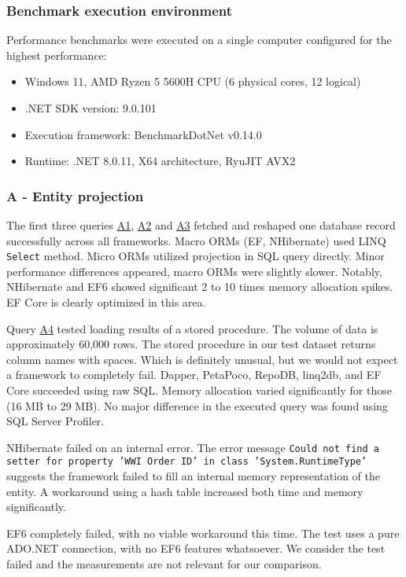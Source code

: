 \subsubsection{Benchmark execution environment}
Performance benchmarks were executed on a single computer configured for the highest performance:
\begin{itemize}
    \item Windows 11, AMD Ryzen 5 5600H CPU (6 physical cores, 12 logical)
    \item .NET SDK version: 9.0.101
    \item Execution framework: BenchmarkDotNet v0.14.0
    \item Runtime: .NET 8.0.11, X64 architecture, RyuJIT AVX2
\end{itemize}

\subsubsection{A - Entity projection}
The first three queries \hyperref[query:a1]{A1}, \hyperref[query:a2]{A2} and \hyperref[query:a3]{A3} fetched and reshaped one database record successfully across all frameworks. Macro ORMs (EF, NHibernate) used LINQ \texttt{Select} method. Micro ORMs utilized projection in SQL query directly.
Minor performance differences appeared, macro ORMs were slightly slower. Notably, NHibernate and EF6 showed significant 2 to 10 times memory allocation spikes. EF Core is clearly optimized in this area.

Query \hyperref[query:a4]{A4} tested loading results of a stored procedure. The volume of data is approximately 60,000 rows. The stored procedure in our test dataset returns column names with spaces. Which is definitely unusual, but we would not expect a framework to completely fail. Dapper, PetaPoco, RepoDB, linq2db, and EF Core succeeded using raw SQL. Memory allocation varied significantly for those (16 MB to 29 MB). No major difference in the executed query was found using SQL Server Profiler.

NHibernate failed on an internal error. The error message \texttt{Could not find a setter for property 'WWI Order ID' in class 'System.RuntimeType'} suggests the framework failed to fill an internal memory representation of the entity. A workaround using a hash table increased both time and memory significantly.

EF6 completely failed, with no viable workaround this time. The test uses a pure ADO.NET connection, with no EF6 features whatsoever. We consider the test failed and the measurements are not relevant for our comparison.


